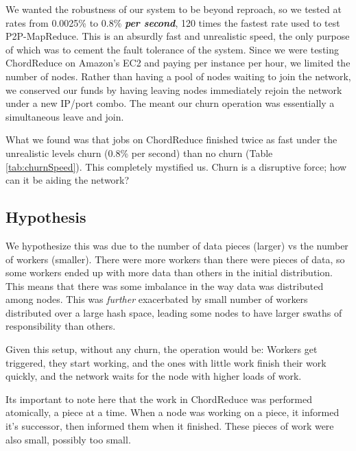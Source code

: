 We wanted the robustness of our system to be beyond reproach, so we tested at rates from 0.0025\% to 0.8\% \textbf{\textit{per second}}, 120 times the fastest rate used to test P2P-MapReduce.
This is an absurdly fast and unrealistic speed, the only purpose of which was to cement the fault tolerance of the system.
Since we were testing ChordReduce on Amazon's EC2 and paying per instance per hour, we limited the number of nodes.
Rather than having a pool of nodes waiting to join the network, we conserved our funds by having leaving nodes immediately rejoin the network under a new IP/port combo.
The meant our churn operation was essentially a simultaneous leave and join.


What we found was that jobs on ChordReduce finished twice as fast under the unrealistic levels churn (0.8\% per second) than no churn (Table \ref{tab:churnSpeed}).
This completely mystified us.
Churn is a disruptive force; how can it be aiding the network?

\subsection*{Hypothesis}
We hypothesize this was due to the number of data pieces (larger) vs the number of workers (smaller).
There were more workers than there were pieces of data, so some workers ended up with more data than others in the initial distribution.
This means that there was some imbalance in the way data was distributed among nodes.
This was \textit{further} exacerbated by small number of workers distributed over a large hash space, leading some nodes to have larger swaths of responsibility than others.

Given this setup, without any churn, the operation would be:
Workers get triggered, they start working, and the ones with little work finish their work quickly, and the network waits for the node with higher loads of work.

Its important to note here that the work in ChordReduce was performed atomically, a piece at a time.
When a node was working on a piece, it informed it's successor, then informed them when it finished.
These pieces of work were also small, possibly too small.

